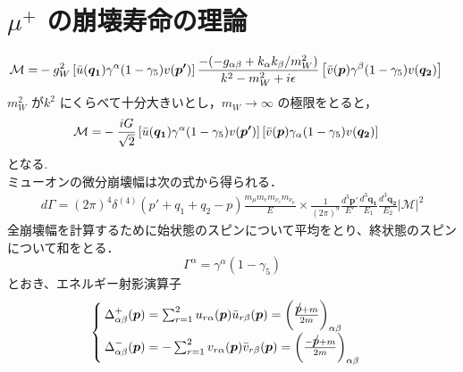



%

\section{$\mu^{+}$ の崩壊寿命の理論}%

\begin{align}
\mathcal{M} = &-g_{W}^2\left[\Bar{u}(\bm{q_{1}})\gamma^{\alpha}(1 - \gamma_{5})v(\bm{p'})\right]
\frac{-(-g_{\alpha\beta} + k_{\alpha}k_{\beta}/m_{W}^2)}{k^{2} - m_{W}^2 + i\epsilon}\left[\Bar{v}(\bm{p})\gamma^{\beta}(1 - \gamma_5)v(\bm{q_{2}})\right]
\end{align}
%
$m_{W}^2$ が$k^2$ にくらべて十分大きいとし，$m_{W} \rightarrow \infty$ の極限をとると，
%
\begin{align}
\mathcal{M} = &-\frac{iG}{\sqrt{2}}\left[\Bar{u}(\bm{q_{1}})\gamma^{\alpha}(1 - \gamma_{5})v(\bm{p'})\right]
\left[\Bar{v}(\bm{p})\gamma_{\alpha}(1 - \gamma_5)v(\bm{q_{2}})\right]
\end{align}
%
となる.\\
ミューオンの微分崩壊幅は次の式から得られる．
%
\begin{align}
d\Gamma = (2\pi)^{4}\delta^{(4)}(p'+q_{1}+q_{2}-p)\frac{m_{\mu}m_{e}m_{\nu_{e}}m_{\nu_{\mu}}}{E}\times\frac{1}{(2\pi)^9}\frac{d^3\bm{p'}}{E'}
\frac{d^3\bm{q_{1}}}{E_{1}}\frac{d^3\bm{q_{2}}}{E_{2}}|\mathcal{M}|^{2}\label{eq:decay}
\end{align}
%
全崩壊幅を計算するために始状態のスピンについて平均をとり、終状態のスピンについて和をとる．
\[\Gamma^{\alpha}=\gamma^{\alpha}(1 - \gamma_{5})\]
%
とおき、エネルギー射影演算子
\begin{eqnarray}
  \begin{cases}
    \Delta^{+}_{\alpha\beta}(\bm{p})=\sum_{r=1}^{2}u_{r\alpha}(\bm{p})\bar{u}_{r\beta}(\bm{p})=\left(\frac{\Slash{p}+m}{2m}\right)_{\alpha\beta} &\\
    \Delta^{-}_{\alpha\beta}(\bm{p})=-\sum_{r=1}^{2}v_{r\alpha}(\bm{p})\bar{v}_{r\beta}(\bm{p})=\left(\frac{-\Slash{p}+m}{2m}\right)_{\alpha\beta} &
  \end{cases}
\end{eqnarray}
